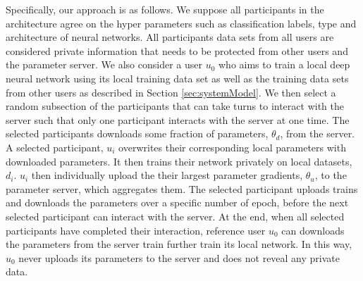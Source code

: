 \documentclass[conference]{IEEEtran}
\begin{document}
Specifically, our approach is as follows. We suppose all participants in the architecture agree on the hyper parameters such as classification labels, type and architecture of neural networks.
All participants data sets from all users are considered private information that needs to be protected from other users and the parameter server. We also consider a user $u_0$ who aims to train a local deep neural network using its local training data set as well as the training data sets from other users as described in Section \ref{sec:systemModel}. 
We then select a random subsection of the participants that can take turns to interact with the server such that only one participant interacts with the server at one time. The selected participants downloads some fraction of parameters, $\theta_d$, from the server. A selected participant, $u_i$  overwrites their corresponding local parameters with downloaded parameters. It then trains their network privately on local datasets, $d_i$. $u_i$ then individually upload the their largest parameter gradients, $\theta_u$,  to the parameter server, which aggregates them.
The selected participant uploads trains and downloads the parameters over a specific number of epoch, before the next selected participant can interact with the server.
At the end, when all selected participants have completed their interaction, reference user $u_0$ can downloads the parameters from the server train further train its local network. In this way, $u_0$ never uploads its parameters to the server and does not reveal any private data. 
\end{document}
